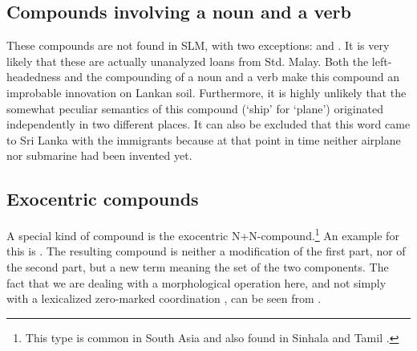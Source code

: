 
\subsection{Compounds involving a noun and a verb}\label{sec:wofo:CompoundsofV+N}
These compounds are not found in SLM, with two exceptions:  and . It is very likely that these are actually unanalyzed loans  from Std. Malay. Both the left-headedness and the compounding of a noun and a verb make this compound an improbable innovation on Lankan soil. Furthermore, it is highly unlikely that the somewhat peculiar semantics of this compound (`ship' for `plane') originated independently in two different places.
It can also be excluded that this word came to Sri Lanka with the immigrants because at that point in time neither airplane nor submarine had been invented yet.

\subsection{Exocentric compounds}\label{sec:wofo:Exocentriccompounds}
A special kind of compound is the exocentric N+N-compound.\footnote{This type is common in South Asia  and also found in Sinhala \citep[131]{Karunatillake2004} and Tamil \citep[96]{Arden1934}.} An example for this is . The resulting compound is neither a modification of the first part, nor of the second part, but a new term meaning the set of the two components. The fact that we are dealing with a morphological operation here, and not simply with a lexicalized zero-marked coordination , can be seen from .



